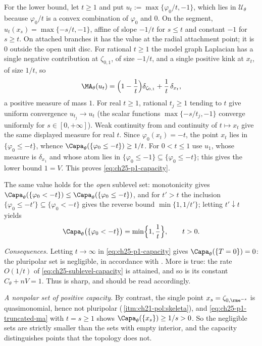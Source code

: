 \begin{example}
For the lower bound, let $t\geq1$ and put
$u_t:=\max\{\varphi_0/t,-1\}$, which lies in $\mathcal U_\theta$ because
$\varphi_0/t$ is a convex combination of $\varphi_0$ and $0$.  On the
segment, $u_t(x_s)=\max\{-s/t,-1\}$, affine of slope $-1/t$ for
$s\leq t$ and constant $-1$ for $s\geq t$.  On attached branches it
has the value at the radial attachment point; it is $0$ outside the open
unit disc.  For rational $t\geq1$ the model graph Laplacian has a single negative contribution at
$\zeta_{0,1}$, of size $-1/t$, and a single positive kink at $x_t$, of
size $1/t$, so
\begin{equation}
\label{eq:ch25-p1-truncated-ma}
 \MA_\theta(u_t)=\Bigl(1-\frac1t\Bigr)\delta_{\zeta_{0,1}}
   +\frac1t\,\delta_{x_t},
\end{equation}
a positive measure of mass $1$.  For real $t\geq1$, rational
$t_j\geq1$ tending to $t$ give uniform convergence $u_{t_j}\to u_t$
(the scalar functions $\max\{-s/t_j,-1\}$ converge uniformly for
$s\in[0,+\infty]$).  Weak continuity from
 and continuity of $t\mapsto x_t$
give the same displayed measure for real $t$.
Since $\varphi_0(x_t)=-t$, the point $x_t$ lies in
$\{\varphi_0\leq-t\}$, whence
$\Capa_\theta(\{\varphi_0\leq-t\})\geq1/t$.  For $0<t\leq1$ use
$u_1$, whose measure is $\delta_{x_1}$ and whose atom lies in
$\{\varphi_0\leq-1\}\subseteq\{\varphi_0\leq-t\}$; this gives the lower
bound $1=V$.  This proves \eqref{eq:ch25-p1-capacity}.

The same value holds for the \emph{open} sublevel set: monotonicity gives
$\Capa_\theta(\{\varphi_0<-t\})\leq\Capa_\theta(\{\varphi_0\leq-t\})$, and
for $t'>t$ the inclusion
$\{\varphi_0\leq-t'\}\subseteq\{\varphi_0<-t\}$ gives the reverse bound
$\min\{1,1/t'\}$; letting $t'\downarrow t$ yields
\begin{equation}
\label{eq:ch25-p1-capacity-open}
 \Capa_\theta\bigl(\{\varphi_0<-t\}\bigr)=\min\Bigl\{1,\frac1t\Bigr\},
 \qquad t>0 .
\end{equation}

\emph{Consequences.}  Letting $t\to\infty$ in
\eqref{eq:ch25-p1-capacity} gives
$\Capa_\theta(\{T=0\})=0$: the pluripolar set is negligible, in accordance
with .  More is true: the rate
$O(1/t)$ of \eqref{eq:ch25-sublevel-capacity} is attained, and so is its
constant $C_\theta+nV=1$.  Thus  is
sharp, and  should be read accordingly.

\emph{A nonpolar set of positive capacity.}  By contrast, the single point
$x_s=\zeta_{0,\rme^{-s}}$ is quasimonomial, hence not pluripolar
(\,\cref{itm:ch21-pol:skeleta}), and
\eqref{eq:ch25-p1-truncated-ma} with $t=s\geq1$ shows
$\Capa_\theta(\{x_s\})\geq1/s>0$.  So the negligible sets are strictly
smaller than the sets with empty interior, and the capacity distinguishes
points that the topology does not.
\end{example}

